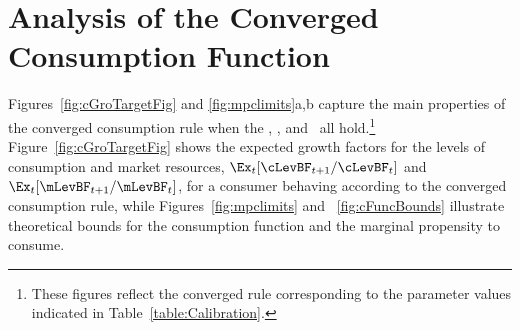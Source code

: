 \documentclass[BufferStockTheory]{subfiles}
\begin{document}
\hypertarget{AnalysisoftheConvergedConsumptionFunction}{}
\section{Analysis of the Converged Consumption Function}\label{sec:convergedcfunc}

Figures~\ref{fig:cGroTargetFig} and \ref{fig:mpclimits}a,b capture the
main properties of the converged consumption rule when the \RIC, \GICNrm,
and \FHWC~all hold.\footnote{These figures reflect the converged rule
  corresponding to the parameter values indicated in
  Table~\ref{table:Calibration}.}  Figure~\ref{fig:cGroTargetFig}
shows the expected growth factors for the levels of consumption and market resources,
$\Ex_{t}[\cLevBF_{t+1}/\cLevBF_{t}]$ and $\Ex_{t}[\mLevBF_{t+1}/\mLevBF_{t}]$, for a consumer behaving according to the converged consumption rule, while Figures~\ref{fig:mpclimits} and ~\ref{fig:cFuncBounds} illustrate theoretical bounds for the consumption function and the
marginal propensity to consume.
\end{document}
